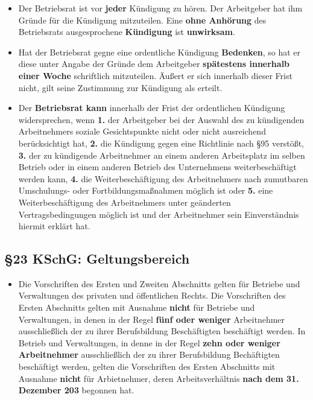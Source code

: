 \documentclass[a4paper, 12pt]{report}
\begin{document}
\begin{multicols}{2}
\begin{itemize}
    \item[(1)] Der Betriebsrat ist vor \textbf{jeder} Kündigung zu hören. Der
	Arbeitgeber hat ihm Gründe für die Kündigung mitzuteilen. Eine
	\textbf{ohne Anhörung} des Betriebsrats ausgesprochene
	\textbf{Kündigung} ist \textbf{unwirksam}.
    \item[(2)] Hat der Betriebsrat gegne eine ordentliche Kündigung
	\textbf{Bedenken}, so hat er diese unter Angabe der Gründe dem
	Arbeitgeber \textbf{spätestens innerhalb einer Woche} schriftlich
	mitzuteilen. Äußert er sich innerhalb dieser Frist nicht, gilt seine
	Zustimmung zur Kündigung als erteilt.
    \item[(3)] Der \textbf{Betriebsrat kann} innerhalb der Frist der
	ordentlichen Kündigung widersprechen, wenn \textbf{1.} der Arbeitgeber
	bei der Auswahl des zu kündigenden Arbeitnehmers soziale Gesichtspunkte
	nicht oder nicht ausreichend berücksichtigt hat, \textbf{2.} die
	Kündigung gegen eine Richtlinie nach \S 95 verstößt, \textbf{3.} der
	zu kündigende Arbeitnehmer an einem anderen Arbeitsplatz im selben
	Betrieb oder in einem anderen Betrieb des Unternehmens weiterbeschäftigt
	werden kann, \textbf{4.} die Weiterbeschäftigung des Arbeitnehmers nach
	zumutbaren Umschulungs- oder Fortbildungsmaßnahmen möglich ist oder
	\textbf{5.} eine Weiterbeschäftigung des Arbeitnehmers unter geänderten
	Vertragsbedingungen möglich ist und der Arbeitnehmer sein Einverständnis
	hiermit erklärt hat.
\end{itemize}

\subsection{\S 23 KSchG: Geltungsbereich}

\begin{itemize}
    \item[(1)] Die Vorschriften des Ersten und Zweiten Abschnitts gelten für
	Betriebe und Verwaltungen des privaten und öffentlichen Rechts. Die
	Vorschriften des Ersten Abschnitts gelten mit Ausnahme \textbf{nicht}
	für Betriebe und Verwaltungen, in denen in der Regel
	\textbf{fünf oder weniger} Arbeitnehmer ausschließlich der zu ihrer
	Berufsbildung Beschäftigten beschäftigt werden. In Betrieb und
	Verwaltungen, in denne in der Regel \textbf{zehn oder weniger
	Arbeitnehmer} ausschließlich der zu ihrer Berufsbildung Bechäftigten
	beschäftigt werden, gelten die Vorschriften des Ersten Abschnitts mit
	Ausnahme \textbf{nicht} für Arbietnehmer, deren Arbeitsverhältnis
	\textbf{nach dem 31. Dezember 203} begonnen hat.
\end{itemize}


\end{multicols}
\end{document}
